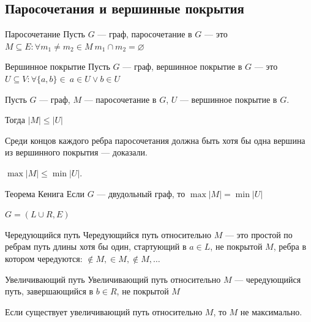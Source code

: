 \subsection{Паросочетания и вершинные покрытия}

\begin{defn}{Паросочетание}{}
    Пусть \( G \) --- граф,
    паросочетание в \( G \) --- это \( M \subseteq E : \forall m_1 \neq m_2 \in M \ m_1 \cap m_2 = \varnothing \)
\end{defn}

\begin{defn}{Вершинное покрытие}{}
    Пусть \( G \) --- граф,
    вершинное покрытие в \( G \) --- это \( U \subseteq V : \forall \{ a, b \} \in \ a \in U \lor b \in U \)
\end{defn}

\begin{prop}{}{}
    Пусть \( G \) --- граф, \( M \) --- паросочетание в \( G \), \( U \) --- вершинное покрытие в \( G \).

    Тогда \( |M| \leq |U| \)
\end{prop}

Среди концов каждого ребра паросочетания должна быть хотя бы одна вершина из вершинного покрытия --- доказали.

\begin{coroll}{}{}
    \( \max |M| \leq \min |U| \).
\end{coroll}

\begin{thrm}{Теорема Кенига}{}
    Если \( G \) --- двудольный граф, то \( \max |M| = \min |U| \)
\end{thrm}

\( G = (L \cup R, E) \)

\begin{defn}{Чередующийся путь}{}
    Чередующийся путь относительно \( M \) --- это простой по ребрам путь длины хотя бы один,
    стартующий в \( a \in L \), не покрытой \( M \),
    ребра в котором чередуются: \( \notin M, \in M, \notin M, \ldots \)
\end{defn}

\begin{defn}{Увеличивающий путь}{}
    Увеличивающий путь относительно \( M \) --- чередующийся путь, завершающийся в \( b \in R \),
    не покрытой \( M \)
\end{defn}

\begin{exercise}{}{}
    Если существует увеличивающий путь относительно \( M \), то \( M \) не максимально.
\end{exercise}

